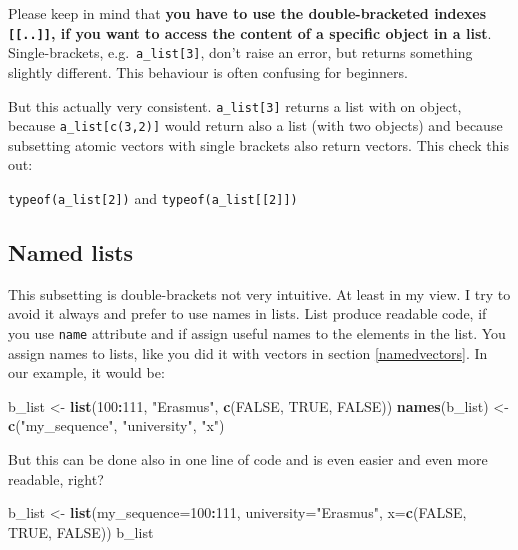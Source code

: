 \documentclass[
]{scrartcl}
\makeatletter
\newenvironment{Shaded}{\begin{snugshade}}{\end{snugshade}}
\newcommand{\AttributeTok}[1]{\textcolor[rgb]{0.13,0.29,0.53}{#1}}
\newcommand{\ConstantTok}[1]{\textcolor[rgb]{0.56,0.35,0.01}{#1}}
\newcommand{\DecValTok}[1]{\textcolor[rgb]{0.00,0.00,0.81}{#1}}
\newcommand{\FunctionTok}[1]{\textcolor[rgb]{0.13,0.29,0.53}{\textbf{#1}}}
\newcommand{\NormalTok}[1]{#1}
\newcommand{\OtherTok}[1]{\textcolor[rgb]{0.56,0.35,0.01}{#1}}
\newcommand{\SpecialCharTok}[1]{\textcolor[rgb]{0.81,0.36,0.00}{\textbf{#1}}}
\newcommand{\StringTok}[1]{\textcolor[rgb]{0.31,0.60,0.02}{#1}}
\newenvironment{kframe}{%
\medskip{}
\setlength{\fboxsep}{.8em}
 \def\at@end@of@kframe{}%
 \ifinner\ifhmode%
  \def\at@end@of@kframe{\end{minipage}}%
  \begin{minipage}{\columnwidth}%
 \fi\fi%
 \def\FrameCommand##1{\hskip\@totalleftmargin \hskip-\fboxsep
 \colorbox{shadecolor}{##1}\hskip-\fboxsep
     \hskip-\linewidth \hskip-\@totalleftmargin \hskip\columnwidth}%
 \MakeFramed {\advance\hsize-\width
   \@totalleftmargin\z@ \linewidth\hsize
   \@setminipage}}%
 {\par\unskip\endMakeFramed%
 \at@end@of@kframe}
\newenvironment{rmdblock}[1]
  {
  \begin{itemize}
  \renewcommand{\labelitemi}{
    \raisebox{-.7\height}[0pt][0pt]{
      {\setkeys{Gin}{width=3em,keepaspectratio}\texttt{[image: images/\#1]}}
    }
  }
  \setlength{\fboxsep}{1em}
  \begin{kframe}
  \item
  }
  {
  \end{kframe}
  \end{itemize}
  }
\newenvironment{geek}
    {\begin{rmdblock}{geek}}
    {\end{rmdblock}}
\makeatother
\begin{document}
Please keep in mind that \textbf{you have to use the double-bracketed indexes \texttt{{[}{[}..{]}{]}}, if you want to access the content of a specific object in a list}. Single-brackets, e.g.~\texttt{a\_list{[}3{]}}, don't raise an error, but returns something slightly different. This behaviour is often confusing for beginners.

\begin{geek}
But this actually very consistent. \texttt{a\_list{[}3{]}} returns a
list with on object, because \texttt{a\_list{[}c(3,2){]}} would return
also a list (with two objects) and because subsetting atomic vectors
with single brackets also return vectors. This check this out:

\texttt{typeof(a\_list{[}2{]})} and
\texttt{typeof(a\_list{[}{[}2{]}{]})}
\end{geek}

\subsection{Named lists}\label{namedlists}

This subsetting is double-brackets not very intuitive. At least in my view. I try to avoid it always and prefer to use names in lists. List produce readable code, if you use \texttt{name} attribute and if assign useful names to the elements in the list. You assign names to lists, like you did it with vectors in section \ref{namedvectors}. In our example, it would be:

\begin{Shaded}
\begin{Highlighting}[]
\NormalTok{b\_list }\OtherTok{\textless{}{-}} \FunctionTok{list}\NormalTok{(}\DecValTok{100}\SpecialCharTok{:}\DecValTok{111}\NormalTok{, }\StringTok{"Erasmus"}\NormalTok{, }\FunctionTok{c}\NormalTok{(}\ConstantTok{FALSE}\NormalTok{, }\ConstantTok{TRUE}\NormalTok{, }\ConstantTok{FALSE}\NormalTok{))}
\FunctionTok{names}\NormalTok{(b\_list) }\OtherTok{\textless{}{-}} \FunctionTok{c}\NormalTok{(}\StringTok{"my\_sequence"}\NormalTok{, }\StringTok{"university"}\NormalTok{, }\StringTok{"x"}\NormalTok{)}
\end{Highlighting}
\end{Shaded}

But this can be done also in one line of code and is even easier and even more readable, right?

\begin{Shaded}
\begin{Highlighting}[]
\NormalTok{b\_list }\OtherTok{\textless{}{-}} \FunctionTok{list}\NormalTok{(}\AttributeTok{my\_sequence=}\DecValTok{100}\SpecialCharTok{:}\DecValTok{111}\NormalTok{, }\AttributeTok{university=}\StringTok{"Erasmus"}\NormalTok{, }\AttributeTok{x=}\FunctionTok{c}\NormalTok{(}\ConstantTok{FALSE}\NormalTok{, }\ConstantTok{TRUE}\NormalTok{, }\ConstantTok{FALSE}\NormalTok{))}
\NormalTok{b\_list}
\end{Highlighting}
\end{Shaded}
\end{document}
